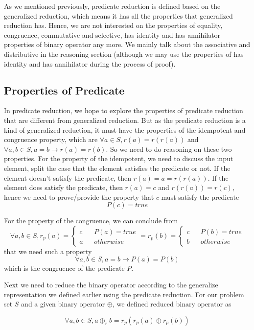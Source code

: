 \documentclass[a4paper,12pt,twoside,openright]{report}
\newcommand{\e}[2]{
\begin{equation}
  \label{#1} 
  #2
\end{equation}
}
\begin{document}
As we mentioned previously, predicate reduction is defined based on the generalized reduction, which means it has all the properties that generalized reduction has. Hence, we are not interested on the properties of equality, congruence, commutative and selective, has identity and has annihilator properties of binary operator any more. We mainly talk about the associative and distributive in the reasoning section (although we may use the properties of has identity and has annihilator during the process of proof).

\subsection{Properties of Predicate}
In predicate reduction, we hope to explore the properties of predicate reduction that are different from generalized reduction.
But as the predicate reduction is a kind of generalized reduction, it must have the properties of the idempotent and congruence property, which are $\forall a \in S, r(a) = r(r(a))$ and $\forall a,b\in S, a = b \rightarrow r(a) = r(b)$. So we need to do reasoning on these two properties. For the property of the idempotent, we need to discuss the input element, split the case that the element satisfies the predicate or not. If the element doesn't satisfy the predicate, then $r(a) = a = r(r(a))$. If the element does satisfy the predicate, then $r(a) = c$ and $r(r(a)) = r(c)$, hence we need to prove/provide the property that $c$ must satisfy the predicate \e{pr:proof:p_true}{P(c) = true}
For the property of the congruence, we can conclude from 
\[\forall a,b \in S, r_p(a)=\left\{
\begin{aligned}
c &  & P(a) = true \\
a &  & otherwise 
\end{aligned}
\right. = 
r_p(b)=\left\{
\begin{aligned}
c &  & P(b) = true \\
b &  & otherwise 
\end{aligned}
\right.\] that we need such a property \e{pr:proof:p_cong}{\forall a,b \in S, a = b \rightarrow P(a) = P(b)} which is the congruence of the predicate $P$.

Next we need to reduce the binary operator according to the generalize representation we defined earlier using the predicate reduction. For our problem set $S$ and a given binary operator $\oplus$, we defined reduced binary operator as 
\e{pr:def:binary_operator}{\forall a,b \in S, a \oplus_r b = r_p (r_p(a) \oplus r_p(b))}
\end{document}
